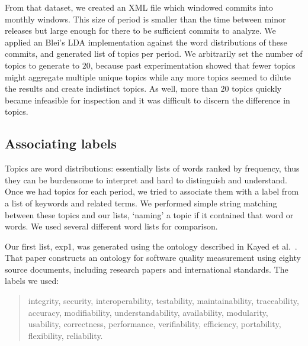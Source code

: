 \documentclass{acm_proc_article-sp}
\begin{document}
From that dataset, we created an XML file which windowed commits into
monthly windows. This size of period is smaller than the time between minor releases but large enough for there to be sufficient commits to analyze. We applied an Blei's LDA implementation against the word distributions of these commits, and generated list of topics per period. 
We arbitrarily set the number of topics to generate to $20$, because past experimentation showed that fewer topics might aggregate multiple unique topics while any more topics seemed to dilute the results and create indistinct topics. As well, more than $20$ topics quickly became infeasible for inspection and it was difficult to discern the difference in topics.

\subsection{Associating labels}
\begin{comment}
\end{comment}

Topics are word distributions: essentially lists of words ranked by frequency, thus they can be burdensome to interpret and hard to distinguish and understand.
Once we had topics for each period, we tried to associate them with a label from a list of keywords and related terms. We performed simple string matching between these topics and our lists, `naming' a topic if it contained that word or words. We used several different word lists for comparison. 

Our first list, \textsf{exp1}, was generated using the ontology described in Kayed et al.~\cite{5072519}. That paper constructs an ontology for software quality measurement using eighty source documents, including research papers and international standards. The labels we used:
\begin{quotation}
\small \noindent \textsf{
integrity, security,
interoperability, testability, maintainability, traceability,
accuracy, modifiability, understandability, availability, modularity,
usability, correctness, performance, verifiability, efficiency,
portability, flexibility, reliability.
}
\end{quotation}
\end{document}
